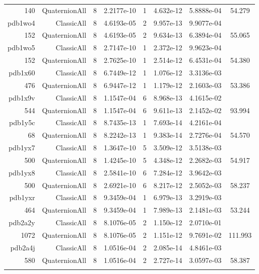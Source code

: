 \begin{xltabular}{\textwidth}{r|rcS[table-format=1.4e+2]cS[table-format=1.3e+2]S[table-format=1.4e+2]S[table-format=-1.3]}
140 & QuaternionAll & 8 & 2.2177e-10 & 1 & 4.632e-12 & 5.8888e-04 & 54.279\\  \addlinespace
pdb1wo4 & ClassicAll & 8 & 4.6193e-05 & 2 & 9.957e-13 & 9.9077e-04 & \\
152 & QuaternionAll & 8 & 4.6193e-05 & 2 & 9.634e-13 & 6.3894e-04 & 55.065\\  \addlinespace
pdb1wo5 & ClassicAll & 8 & 2.7147e-10 & 1 & 2.372e-12 & 9.9623e-04 & \\
152 & QuaternionAll & 8 & 2.7625e-10 & 1 & 2.514e-12 & 6.4531e-04 & 54.380\\  \addlinespace
pdb1x60 & ClassicAll & 8 & 6.7449e-12 & 1 & 1.076e-12 & 3.3136e-03 & \\
476 & QuaternionAll & 8 & 6.9447e-12 & 1 & 1.179e-12 & 2.1603e-03 & 53.386\\  \addlinespace
pdb1x9v & ClassicAll & 8 & 1.1547e-04 & 6 & 8.968e-13 & 4.1615e-02 & \\
544 & QuaternionAll & 8 & 1.1547e-04 & 6 & 9.611e-13 & 2.1452e-02 & 93.994\\  \addlinespace
pdb1y5c & ClassicAll & 8 & 8.7435e-13 & 1 & 7.693e-14 & 4.2161e-04 & \\
68 & QuaternionAll & 8 & 8.2242e-13 & 1 & 9.383e-14 & 2.7276e-04 & 54.570\\  \addlinespace
pdb1yx7 & ClassicAll & 8 & 1.3647e-10 & 5 & 3.509e-12 & 3.5138e-03 & \\
500 & QuaternionAll & 8 & 1.4245e-10 & 5 & 4.348e-12 & 2.2682e-03 & 54.917\\  \addlinespace
pdb1yx8 & ClassicAll & 8 & 2.5841e-10 & 6 & 7.284e-12 & 3.9642e-03 & \\
500 & QuaternionAll & 8 & 2.6921e-10 & 6 & 8.217e-12 & 2.5052e-03 & 58.237\\  \addlinespace
pdb1yxr & ClassicAll & 8 & 9.3459e-04 & 1 & 6.979e-13 & 3.2919e-03 & \\
464 & QuaternionAll & 8 & 9.3459e-04 & 1 & 7.989e-13 & 2.1481e-03 & 53.244\\  \addlinespace
pdb2a2y & ClassicAll & 8 & 8.1076e-05 & 2 & 1.150e-12 & 2.0710e-01 & \\
1072 & QuaternionAll & 8 & 8.1076e-05 & 2 & 1.151e-12 & 9.7691e-02 & 111.993\\  \addlinespace
pdb2a4j & ClassicAll & 8 & 1.0516e-04 & 2 & 2.085e-14 & 4.8461e-03 & \\
580 & QuaternionAll & 8 & 1.0516e-04 & 2 & 2.727e-14 & 3.0597e-03 & 58.387\\  \addlinespace

\end{xltabular}
